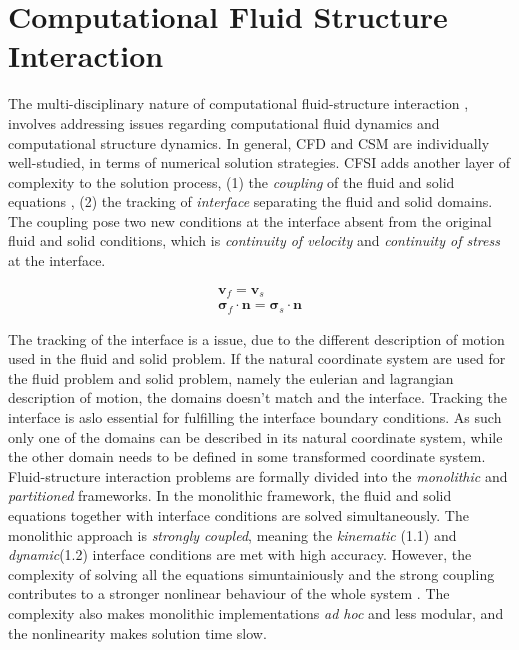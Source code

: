 \chapter{Computational Fluid Structure Interaction}

The multi-disciplinary nature of computational fluid-structure interaction , involves addressing issues regarding computational fluid dynamics and computational structure dynamics. In general, CFD and CSM are individually well-studied, in terms of numerical solution strategies. CFSI adds another layer of complexity to the solution process, (1) the \textit{coupling} of the fluid and solid equations , (2) the tracking of \textit{interface} separating the fluid and solid domains. The coupling pose two new conditions at the interface absent from the original fluid and solid conditions, which is \textit{continuity of velocity} and \textit{continuity of stress} at the interface.

\begin{align}
\mathbf{v}_f = \mathbf{v}_s \\
\mathbf{\sigma}_f \cdot \mathbf{n} = \mathbf{\sigma}_s \cdot \mathbf{n}
\end{align}


The tracking of the interface is a issue, due to the different description of motion used in the fluid and solid problem. If the natural coordinate system are used for the fluid problem and solid problem, namely the eulerian and lagrangian description of motion, the domains doesn't match and the interface. Tracking the interface is aslo essential for fulfilling the interface boundary conditions. As such only one of the domains can be described in its natural coordinate system, while the other domain needs to be defined in some transformed coordinate system.   \\ 

Fluid-structure interaction problems are formally divided into the \textit{monolithic} and \textit{partitioned} frameworks.  In the monolithic framework, the fluid and solid equations together with interface conditions are solved simultaneously. The monolithic approach is  \textit{strongly coupled}, meaning the \textit{kinematic} (1.1) and \textit{dynamic}(1.2) interface conditions are met with high accuracy. However, the complexity of solving all the equations simuntainiously and the strong coupling contributes to a stronger nonlinear behaviour of the whole system \cite{Wick}. The complexity also makes monolithic implementations \textit{ad hoc} and less modular, and the nonlinearity makes solution time slow.

